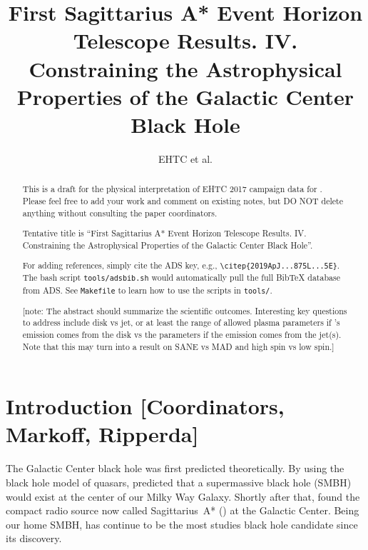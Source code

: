 \documentclass[twocolumn,tighten,dvipsnames]{aastex63}
\newcommand\note[1]{{\color{OliveGreen}[note: #1]}}
\begin{document}
\title{First Sagittarius A* Event Horizon Telescope Results. IV.\\
  Constraining the Astrophysical Properties of the Galactic Center Black Hole}
\author{EHTC et al.}



\received{\today}
\revised{\today}

\begin{abstract}
  \color{BrickRed}

  This is a draft for the physical interpretation of EHTC 2017
  campaign data for \sgra.
  Please feel free to add your work and comment on existing notes, but
  DO NOT delete anything without consulting the paper coordinators.

  Tentative title is ``First Sagittarius A* Event Horizon Telescope
  Results. IV. Constraining the Astrophysical Properties of the
  Galactic Center Black Hole''.

  For adding references, simply cite the ADS key, e.g.,
  \texttt{\textbackslash citep\{2019ApJ...875L...5E\}}.
  The bash script \texttt{tools/adsbib.sh} would automatically pull
  the full BibTeX database from ADS.
  See \texttt{Makefile} to learn how to use the scripts in
  \texttt{tools/}.

  \note{The abstract should summarize the scientific outcomes.
    Interesting key questions to address include disk vs jet, or at
    least the range of allowed plasma parameters if \sgra's emission
    comes from the disk vs the parameters if the emission comes from
    the jet(s).
    Note that this may turn into a result on SANE vs MAD and high spin
    vs low spin.}
\end{abstract}


\tableofcontents

\section{Introduction
  [Coordinators, Markoff, Ripperda]}
\label{sec:intro}


The Galactic Center black hole was first predicted theoretically.
By using the black hole model of quasars, \citet{1971MNRAS.152..461L}
predicted that a supermassive black hole (SMBH) would exist at the
center of our Milky Way Galaxy.
Shortly after that, \citet{1974ApJ...194..265B, 1975A&A....43..159E,
  1975ApJ...202L..63L} found the compact radio source now called
Sagittarius~A* (\sgra) at the Galactic Center.
Being our home SMBH, \sgra has continue to be the most studies black
hole candidate since its discovery.
\end{document}

